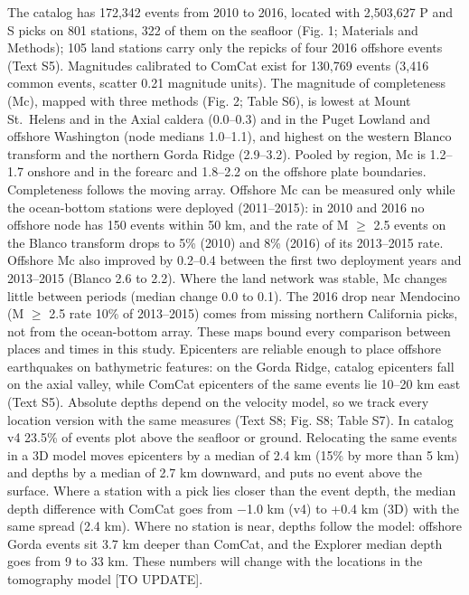 \documentclass[11pt]{article}
\begin{document}
The catalog has 172,342 events from 2010 to 2016, located with 2,503,627
P and S picks on 801 stations, 322 of them on the seafloor (Fig. 1;
Materials and Methods); 105 land stations carry only the repicks of four
2016 offshore events (Text S5). Magnitudes calibrated to ComCat exist
for 130,769 events (3,416 common events, scatter 0.21 magnitude units).
The magnitude of completeness (Mc), mapped with three methods (Fig. 2;
Table S6), is lowest at Mount St.~Helens and in the Axial caldera
(0.0--0.3) and in the Puget Lowland and offshore Washington (node
medians 1.0--1.1), and highest on the western Blanco transform and the
northern Gorda Ridge (2.9--3.2). Pooled by region, Mc is 1.2--1.7
onshore and in the forearc and 1.8--2.2 on the offshore plate
boundaries. Completeness follows the moving array. Offshore Mc can be
measured only while the ocean-bottom stations were deployed
(2011--2015): in 2010 and 2016 no offshore node has 150 events within 50
km, and the rate of M \ensuremath{\geq} 2.5 events on the Blanco transform drops to 5\%
(2010) and 8\% (2016) of its 2013--2015 rate. Offshore Mc also improved
by 0.2--0.4 between the first two deployment years and 2013--2015
(Blanco 2.6 to 2.2). Where the land network was stable, Mc changes
little between periods (median change 0.0 to 0.1). The 2016 drop near
Mendocino (M \ensuremath{\geq} 2.5 rate 10\% of 2013--2015) comes from missing northern
California picks, not from the ocean-bottom array. These maps bound
every comparison between places and times in this study. Epicenters are
reliable enough to place offshore earthquakes on bathymetric features:
on the Gorda Ridge, catalog epicenters fall on the axial valley, while
ComCat epicenters of the same events lie 10--20 km east (Text S5).
Absolute depths depend on the velocity model, so we track every location
version with the same measures (Text S8; Fig. S8; Table S7). In catalog
v4 23.5\% of events plot above the seafloor or ground. Relocating the
same events in a 3D model moves epicenters by a median of 2.4 km (15\%
by more than 5 km) and depths by a median of 2.7 km downward, and puts
no event above the surface. Where a station with a pick lies closer than
the event depth, the median depth difference with ComCat goes from \ensuremath{-}1.0
km (v4) to +0.4 km (3D) with the same spread (2.4 km). Where no station
is near, depths follow the model: offshore Gorda events sit 3.7 km
deeper than ComCat, and the Explorer median depth goes from 9 to 33 km.
These numbers will change with the locations in the tomography model
{[}TO UPDATE{]}.
\end{document}
